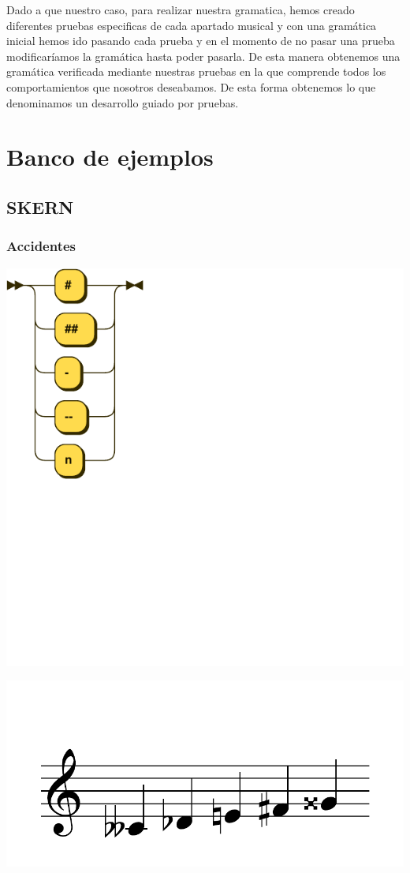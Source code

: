 \documentclass{article}
\begin{document}
Dado a que nuestro caso, para realizar nuestra gramatica, hemos creado diferentes pruebas especificas de cada apartado musical
 y con una gramática inicial hemos ido pasando cada prueba y en el momento de no pasar una prueba modificaríamos la gramática
hasta poder pasarla. De esta manera obtenemos una gramática verificada mediante nuestras pruebas en la que comprende todos
los comportamientos que nosotros deseabamos. De esta forma obtenemos lo que denominamos un desarrollo guiado por pruebas.

\section{Banco de ejemplos}
\subsection{SKERN}
\subsubsection{Accidentes}
\includegraphics[scale=0.5]{figures_railroad/pdf/skern/accidents.pdf}

\includegraphics[scale=0.5]{figures_tests/pdf/skern/accident1.pdf}
\end{document}
